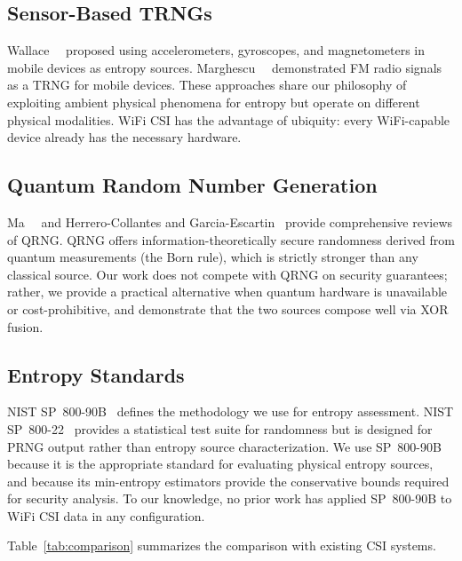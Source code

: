 \subsection{Sensor-Based TRNGs}
\label{subsec:related-trng}

Wallace~\etal~\cite{wallace2016sensortrng} proposed using accelerometers, gyroscopes, and magnetometers in mobile devices as entropy sources.
Marghescu~\etal~\cite{marghescu2019fmtrng} demonstrated FM radio signals as a TRNG for mobile devices.
These approaches share our philosophy of exploiting ambient physical phenomena for entropy but operate on different physical modalities.
WiFi CSI has the advantage of ubiquity: every WiFi-capable device already has the necessary hardware.

\subsection{Quantum Random Number Generation}
\label{subsec:related-qrng}

Ma~\etal~\cite{ma2016qrng} and Herrero-Collantes and Garcia-Escartin~\cite{herrero2017qrng} provide comprehensive reviews of QRNG.
QRNG offers information-theoretically secure randomness derived from quantum measurements (the Born rule), which is strictly stronger than any classical source.
Our work does not compete with QRNG on security guarantees; rather, we provide a practical alternative when quantum hardware is unavailable or cost-prohibitive, and demonstrate that the two sources compose well via XOR fusion.

\subsection{Entropy Standards}
\label{subsec:related-standards}

NIST SP~800-90B~\cite{nist2018sp80090b} defines the methodology we use for entropy assessment.
NIST SP~800-22~\cite{nist2010sp80022} provides a statistical test suite for randomness but is designed for PRNG output rather than entropy source characterization.
We use SP~800-90B because it is the appropriate standard for evaluating physical entropy sources, and because its min-entropy estimators provide the conservative bounds required for security analysis.
To our knowledge, no prior work has applied SP~800-90B to WiFi CSI data in any configuration.


Table~\ref{tab:comparison} summarizes the comparison with existing CSI systems.

